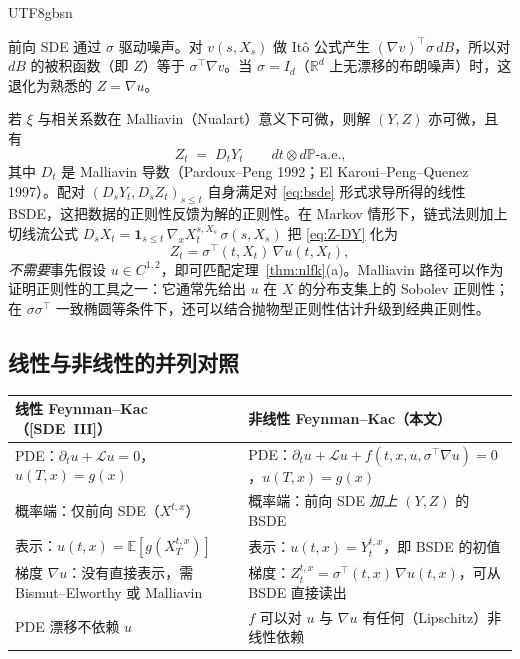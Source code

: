 \documentclass{article}
\theoremstyle{plain}
\theoremstyle{definition}
\theoremstyle{remark}
\newcommand{\E}{\mathbb{E}}
\newcommand{\Prob}{\mathbb{P}}
\newcommand{\R}{\mathbb{R}}
\newcommand{\Lc}{\mathcal{L}}
\begin{document}
\begin{CJK*}{UTF8}{gbsn}
\begin{remark}
前向 SDE 通过 $\sigma$ 驱动噪声。对 $v(s, X_s)$ 做 It\^o 公式产生 $(\nabla v)^{\top} \sigma\, dB$，所以对 $dB$ 的被积函数（即 $Z$）等于 $\sigma^{\top} \nabla v$。当 $\sigma = I_d$（$\R^d$ 上无漂移的布朗噪声）时，这退化为熟悉的 $Z = \nabla u$。
\end{remark}

\begin{remark}[Malliavin 观点]\label{rem:malliavin}
若 $\xi$ 与相关系数在 Malliavin（Nualart）意义下可微，则解 $(Y, Z)$ 亦可微，且有
\begin{equation}\label{eq:Z-DY}
  Z_t \;=\; D_t Y_t \qquad dt \otimes d\Prob\text{-a.e.,}
\end{equation}
其中 $D_t$ 是 Malliavin 导数（Pardoux--Peng 1992；El Karoui--Peng--Quenez 1997）。配对 $(D_s Y_t, D_s Z_t)_{s \le t}$ 自身满足对 \eqref{eq:bsde} 形式求导所得的线性 BSDE，这把数据的正则性反馈为解的正则性。在 Markov 情形下，链式法则加上切线流公式 $D_s X_t = \mathbf{1}_{s \le t}\,\nabla_x X^{s,X_s}_t\, \sigma(s, X_s)$ 把 \eqref{eq:Z-DY} 化为
\[
  Z_t = \sigma^{\top}(t, X_t)\, \nabla u(t, X_t),
\]
\emph{不需要}事先假设 $u \in C^{1,2}$，即可匹配定理~\ref{thm:nlfk}(a)。Malliavin 路径可以作为证明正则性的工具之一：它通常先给出 $u$ 在 $X$ 的分布支集上的 Sobolev 正则性；在 $\sigma\sigma^{\top}$ 一致椭圆等条件下，还可以结合抛物型正则性估计升级到经典正则性。
\end{remark}

\subsection{线性与非线性的并列对照}

\begin{center}
\begin{tabular}{p{}|p{}}
\textbf{线性 Feynman--Kac（[SDE~III]）} & \textbf{非线性 Feynman--Kac（本文）} \\
\hline
PDE：$\partial_t u + \Lc u = 0$，$u(T, x) = g(x)$ &
PDE：$\partial_t u + \Lc u + f(t, x, u, \sigma^{\top} \nabla u) = 0$，$u(T, x) = g(x)$ \\
\hline
概率端：仅前向 SDE（$X^{t,x}$） &
概率端：前向 SDE \emph{加上} $(Y, Z)$ 的 BSDE \\
\hline
表示：$u(t, x) = \E[g(X^{t,x}_T)]$ &
表示：$u(t, x) = Y^{t,x}_t$，即 BSDE 的初值 \\
\hline
梯度 $\nabla u$：没有直接表示，需 Bismut--Elworthy 或 Malliavin &
梯度：$Z^{t,x}_t = \sigma^{\top}(t, x)\, \nabla u(t, x)$，可从 BSDE 直接读出 \\
\hline
PDE 漂移不依赖 $u$ &
$f$ 可以对 $u$ 与 $\nabla u$ 有任何（Lipschitz）非线性依赖 \\
\end{tabular}
\end{center}


\end{CJK*}
\end{document}
